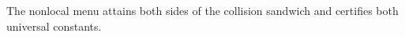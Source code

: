The nonlocal menu attains both sides of the collision sandwich and certifies both universal constants.